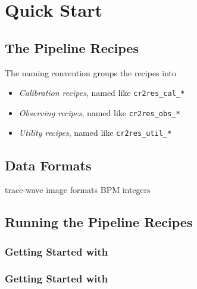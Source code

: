 \section{Quick Start}
\label{sec:cookbook}


\subsection{The \instrument{} Pipeline Recipes}
\label{sec:recipes-quick}


The naming convention groups the recipes into
\begin{itemize}
    \item \textit{Calibration recipes}, named like \texttt{cr2res\_cal\_*}
    \item \textit{Observing recipes}, named like \texttt{cr2res\_obs\_*}
    \item \textit{Utility recipes}, named like \texttt{cr2res\_util\_*}
\end{itemize}

\subsection{\instrument{} Data Formats}
\label{sec:exec-recipes-quick}

trace-wave
image formats
BPM integers

\subsection{Running the \instrument{} Pipeline Recipes}
\label{sec:exec-recipes-quick}


\subsubsection{Getting Started with \gasgano{}}
\label{sec:gasgano-quick}


\subsubsection{Getting Started with \esorex{}}
\label{sec:esorex-quick}


